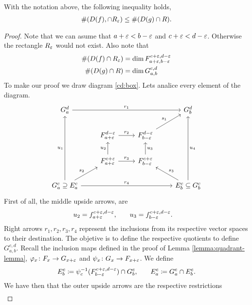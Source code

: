 \begin{lemma} \label{lemma:box-lemma}
    With the notation above, the following inequality holds,
    \begin{align}
        \#(D(f), \cap R_\varepsilon) \leq \#(D(g) \cap R).
    \end{align}
\end{lemma}
\begin{proof}
Note that we can asume that $ a + \varepsilon < b - \varepsilon $ and $ c+\varepsilon < d - \varepsilon $. Otherwise the rectangle $ R_\varepsilon $ would not exist. Also note that
\begin{align}
    \#(D(f) \cap R_\varepsilon) &= \dim F_{a+\varepsilon, b-\varepsilon}^{c+\varepsilon, d-\varepsilon} \\
    \#(D(g) \cap R) &= \dim G_{a, b}^{c, d} \\
\end{align}
To make our proof we draw diagram \ref{cd:box}. Lets analice every element of the diagram.
\begin{equation} \label{cd:box}
\begin{tikzcd}
    G_a^d \arrow[rrr, "r_1"]
    & & & G_b^d \\
    & F_{a+\e}^{d-\e} \arrow[r, "r_2"]
    & F_{b-\e}^{d-\e} \arrow[ru, "s_1"] & \\
    & F_{a+\e}^{c+\e} \arrow[u, "u_2"] \arrow[r, "r_3"]
    & F_{b-\e}^{c+\e} \arrow[u, "u_3"'] & \\
    G_a^c \supseteq E_a^c \arrow[ru, "s_2"] \arrow[uuu, "u_1"] \arrow[rrr, "r_4"]
    & & & E_b^c \subseteq G_b^c \arrow[lu, "s_3"'] \arrow[uuu, "u_4"']
\end{tikzcd}
\end{equation}
First of all, the middle upside arrows, are
\begin{align}
    u_2 &= f_{a+\varepsilon}^{c+\varepsilon, d-\varepsilon}, \quad & u_3 &= f_{b-\varepsilon}^{c+\varepsilon, d-\varepsilon}.
\end{align}
Right arrows $ r_1, r_2, r_3, r_4 $ represent the inclusions from its respective vector spaces to their destination. The objetive is to define the respective quotients to define $ G_{a, b}^{c, d} $. Recall the inclusion maps defined in the proof of Lemma \ref{lemma:quadrant-lemma}, $ \varphi_x \colon F_x \to G_{x+\varepsilon} $ and $ \psi_x \colon G_x \to F_{x+\varepsilon}$. We define
\begin{align}
    E_b^c &\coloneq \psi_c^{-1}(F_{b-\varepsilon}^{c+\varepsilon, d-\varepsilon}) \cap G_b^c, \quad & E_a^c \coloneq G_a^c \cap E_b^c.
\end{align}
We have then that the outer upside arrows are the respective restrictions
\begin{align}

\end{align}
\end{proof}
